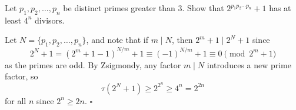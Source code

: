 
\begin{problem}[ISL 2002 N3]
    Let $p_1,p_2,\ldots,p_n$ be distinct primes greater than $3$.
    Show that $2^{p_1p_2\cdots p_n}+1$ has at least $4^n$ divisors.
\end{problem}

\begin{solution}[Ritwin]
    Let $N = \{p_1,p_2,\ldots,p_n\}$, and note that if $m \mid N$, then $2^m+1 \mid 2^N+1$ since
    \[2^N+1 = (2^m+1-1)^{N/m}+1 \equiv (-1)^{N/m}+1 \equiv 0 \pmod{2^m+1}\]
    as the primes are odd. By Zsigmondy, any factor $m \mid N$ introduces a new prime factor,
    so \[\tau(2^N+1) \geq 2^{2^n} \geq 4^n = 2^{2n}\] for all $n$ since $2^n \geq 2n$. $\square$
\end{solution}